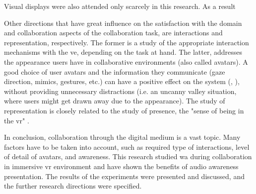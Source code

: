 Visual displays were also attended only scarcely in this research. As a result 

Other directions that have great influence on the satisfaction with the domain and collaboration aspects of the collaboration task, are interactions and representation, respectively. The former is a study of the appropriate interaction mechanisms with the \gls{ve}, depending on the task at hand. The latter, addresses the appearance users have in collaborative environments (also called avatars). A good choice of user avatars and the information they communicate (gaze direction, mimics, gestures, etc.) can have a positive effect on the system (\cite{gutwin_cocoverse_nodate}, \cite{lena_real-time_nodate}), without providing unnecessary distractions (i.e. an uncanny valley situation, where users might get drawn away due to the appearance). The study of representation is closely related to the study of presence, the "sense of being in the \gls{vr}" \cite{schubert_experience_2001}.

In conclusion, collaboration through the digital medium is a vast topic. Many factors have to be taken into account, such as required type of interactions, level of detail of avatars, and awareness. This research studied \gls{wa} during collaboration in immersive \gls{vr} environment and have shown the benefits of audio awareness presentation. The results of the experiments were presented and discussed, and the further research directions were specified.
% 






